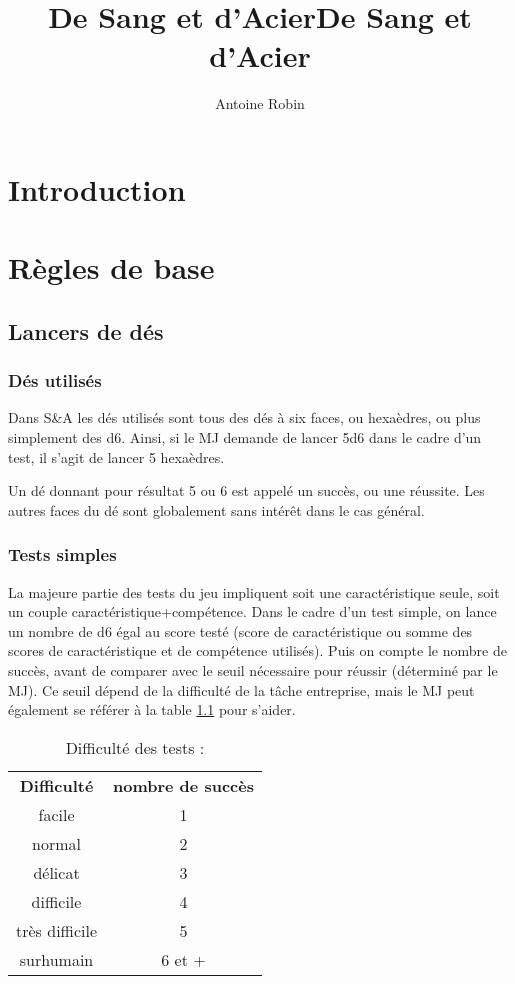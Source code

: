 \documentclass[10pt,a4paper,twocolumn]{book}
\author{Antoine Robin}
\title{De Sang et d'Acier}
\date{}
\newcommand{\sommaire}{\shorttoc{Sommaire}{1}}
\begin{document}
\title{De Sang et d'Acier}
\maketitle
\sommaire
\part*{Introduction}
\part{Règles de base}
\chapter{Lancers de dés}
\section{Dés utilisés}
Dans S\&A les dés utilisés sont tous des dés à six faces, ou hexaèdres, ou plus simplement des d6. Ainsi, si le MJ demande de lancer 5d6 dans le cadre d’un test, il s’agit de lancer 5 hexaèdres.

Un dé donnant pour résultat 5 ou 6 est appelé un succès, ou une réussite. Les autres faces du dé sont globalement sans intérêt dans le cas général.
\section{Tests simples}
La majeure partie des tests du jeu impliquent soit une caractéristique seule, soit un couple caractéristique+compétence.
Dans le cadre d’un test simple, on lance un nombre de d6 égal au score testé (score de caractéristique ou somme des scores de caractéristique et de compétence utilisés). Puis on compte le nombre de succès, avant de comparer avec le seuil nécessaire pour réussir (déterminé par le MJ). Ce seuil dépend de la difficulté de la tâche entreprise, mais le MJ peut également se référer à la table \ref{tableDiffTests} pour s’aider.

\begin{table}
\caption{ Difficulté des tests :}
\label{tableDiffTests}
\begin{center}
\begin{tabular}{cc}
\textbf{Difficulté} & \textbf{nombre de succès} \\
   facile & 1  \\
   normal & 2  \\
   délicat & 3 \\
   difficile & 4 \\
   très difficile & 5 \\
   surhumain & 6 et + \\
\end{tabular}
\end{center}
\end{table}
\end{document}
